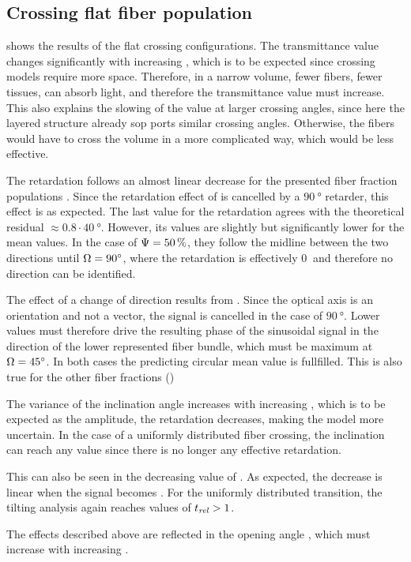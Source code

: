 \subsection{Crossing flat fiber population}
 shows the results of the flat crossing configurations.
The transmittance value changes significantly with increasing \modelOmega{}, which is to be expected since crossing models require more space.
Therefore, in a narrow volume, fewer fibers, \ie{} fewer tissues, can absorb light, and therefore the transmittance value must increase.
This also explains the slowing of the value at larger crossing angles, since here the layered structure already  sop ports similar crossing angles.
Otherwise, the fibers would have to cross the volume in a more complicated way, which would be less effective.
\par
%
The retardation follows an almost linear decrease for the presented fiber fraction populations \modelPsi{}.
Since the retardation effect of is cancelled by a $\SI{90}{\degree}$ retarder, this effect is as expected.
The last value for the retardation agrees with the theoretical residual $\approx 0.8\cdot \SI{40}{\degree}$.
However, its values are slightly but significantly lower for the mean \trel{} values.
In the case of $\textnormal{$\Psi$}{} = \SI{50}{\percent}$, they follow the midline between the two directions until $\textnormal{$\Omega$}=\SI{90}{\degree}$, where the retardation is effectively $\SI{0}{}$ and therefore no direction can be identified.
\par
%
The effect of a change of direction results from \dummy{}.
Since the optical axis is an orientation and not a vector, the signal is cancelled in the case of $\SI{90}{\degree}$.
Lower values must therefore drive the resulting phase of the sinusoidal signal in the direction of the lower represented fiber bundle, which must be maximum at $\textnormal{$\Omega$}=\SI{45}{\degree}$.
In both cases the predicting circular mean value is fullfilled.
This is also true for the other fiber fractions ()
\par
%
The variance of the inclination angle increases with increasing \modelOmega{}, which is to be expected as the amplitude, \ie{} the retardation decreases, making the model more uncertain.
In the case of a uniformly distributed fiber crossing, the inclination can reach any value since there is no longer any effective retardation.
\par
%
This can also be seen in the decreasing value of \trel{}.
As expected, the decrease is linear when the signal becomes \dummy{}.
For the uniformly distributed transition, the tilting analysis again reaches values of $\textnormal{$t_\mathit{rel}$}>1$.
\par
%
The effects described above are reflected in the opening angle \openingAngle{}, which must increase with increasing \modelOmega{}.
%
%
%
